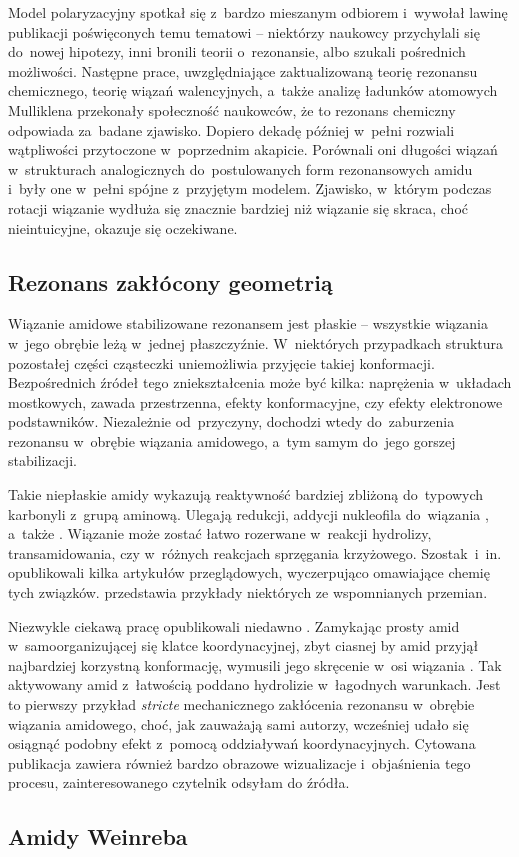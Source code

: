 Model polaryzacyjny spotkał się z~bardzo mieszanym odbiorem i~wywołał lawinę publikacji
  poświęconych temu tematowi \--- niektórzy naukowcy przychylali się do~nowej hipotezy,
  inni bronili teorii o~rezonansie, albo szukali pośrednich możliwości.
Następne prace, uwzględniające zaktualizowaną teorię rezonansu chemicznego,
  teorię wiązań walencyjnych, a~także analizę ładunków atomowych
  Mulliklena przekonały społeczność naukowców, że to rezonans chemiczny
  odpowiada za~badane zjawisko.
Dopiero dekadę później \citeauthor{kemnitz07} w~pełni rozwiali wątpliwości przytoczone
  w~poprzednim akapicie.
Porównali oni długości wiązań w~strukturach analogicznych do~postulowanych form rezonansowych
  amidu i~były one w~pełni spójne z~przyjętym modelem.
Zjawisko, w~którym podczas rotacji wiązanie  wydłuża się znacznie bardziej niż
  wiązanie  się skraca, choć nieintuicyjne, okazuje się oczekiwane. 

\subsection{Rezonans zakłócony geometrią}\label{literature:structure:geometry}
Wiązanie amidowe stabilizowane rezonansem jest płaskie \--- wszystkie wiązania w~jego obrębie
  leżą w~jednej płaszczyźnie.
W~niektórych przypadkach struktura pozostałej części cząsteczki uniemożliwia przyjęcie takiej
  konformacji.
Bezpośrednich źródeł tego zniekształcenia może być kilka: naprężenia w~układach mostkowych,
  zawada przestrzenna, efekty konformacyjne, czy efekty elektronowe podstawników.
Niezależnie od~przyczyny, dochodzi wtedy do~zaburzenia rezonansu w~obrębie wiązania amidowego,
  a~tym samym do~jego gorszej stabilizacji.

Takie niepłaskie amidy wykazują reaktywność bardziej zbliżoną do~typowych karbonyli z~grupą aminową.
Ulegają redukcji, addycji nukleofila do~wiązania , a~także .
Wiązanie  może zostać łatwo rozerwane w~reakcji hydrolizy, transamidowania,
  czy w~różnych reakcjach sprzęgania krzyżowego.
Szostak~i~in. opublikowali kilka artykułów przeglądowych,
  wyczerpująco omawiające chemię tych związków.
 przedstawia przykłady niektórych ze wspomnianych przemian.

Niezwykle ciekawą pracę opublikowali niedawno \citeauthor{takezawa20}.
Zamykając prosty amid w~samoorganizującej się klatce koordynacyjnej, zbyt ciasnej by amid przyjął
  najbardziej korzystną konformację, wymusili jego skręcenie w~osi wiązania
  .
Tak aktywowany amid z~łatwością poddano hydrolizie w~łagodnych warunkach.
Jest to pierwszy przykład \textit{stricte} mechanicznego zakłócenia rezonansu w~obrębie wiązania
  amidowego, choć, jak zauważają sami autorzy, wcześniej udało się osiągnąć podobny efekt z~pomocą
  oddziaływań koordynacyjnych.
Cytowana publikacja zawiera również bardzo obrazowe wizualizacje i~objaśnienia tego procesu,
  zainteresowanego czytelnik odsyłam do źródła.

\subsection{Amidy Weinreba}\label{literature:structure:weinreb}

